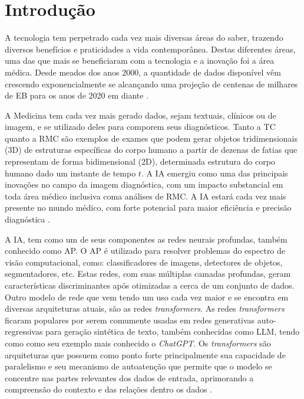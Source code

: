 \chapter{Introdução}
\label{chap:intro}

A tecnologia tem perpetrado cada vez mais diversas áreas do saber, trazendo diversos benefícios e praticidades a vida contemporânea. Destas diferentes áreas, uma das que mais se beneficiaram com a tecnologia e a inovação foi a área médica. Desde meados dos anos 2000, a quantidade de dados disponível vêm crescendo exponencialmente se alcançando uma projeção de centenas de milhares de \gls{EB} para os anos de 2020 em diante \cite{gantzDIGITALUNIVERSE2020}.

A Medicina tem cada vez mais gerado dados, sejam textuais, clínicos ou de imagem, e se utilizado deles para comporem seus diagnósticos. Tanto a \gls{TC} quanto a \gls{RMC} são exemplos de exames que podem gerar objetos tridimensionais (3D) de estruturas específicas do corpo humano a partir de dezenas de fatias que representam de forma bidimensional (2D), determinada estrutura do corpo humano dado um instante de tempo $t$. A \gls{IA} emergiu como uma das principais inovações no campo da imagem diagnóstica, com um impacto substancial em toda área médico inclusiva coma análises de \gls{RMC}. A \gls{IA} estará cada vez mais presente no mundo médico, com forte potencial para maior eficiência e precisão diagnóstica \cite{argentieroApplicationsArtificialIntelligence2022}.

A IA, tem como um de seus componentes as redes neurais profundas, também conhecido como \gls{AP}. O \gls{AP} é utilizado para resolver problemas do espectro de visão computacional, como: classificadores de imagens, detectores de objetos, segmentadores, etc. Estas redes, com suas múltiplas camadas profundas, geram características discriminantes após otimizadas a cerca de um conjunto de dados. Outro modelo de rede que vem tendo um uso cada vez maior e se encontra em diversas arquiteturas atuais, são as redes \textit{transformers}. As redes \textit{transformers} ficaram populares por serem comumente usadas em redes generativas auto-regressivas para geração sintética de texto, também conhecidas como \gls{LLM}, tendo como como seu exemplo mais conhecido o \textit{ChatGPT}. Os \textit{transformers} são arquiteturas que possuem como ponto forte principalmente sua capacidade de paralelismo e seu mecanismo de autoatenção que permite que o modelo se concentre nas partes relevantes dos dados de entrada, aprimorando a compreensão do contexto e das relações dentro os dados \cite{russell2020artificial}.

